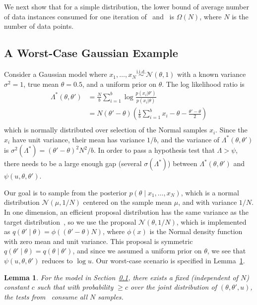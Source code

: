 \documentclass[twoside]{article} \usepackage{aistats2017}
\newcommand{\simiid}{\overset{\textrm{i.i.d.}}{\sim}}
\newtheorem{lemma}{Lemma}
\begin{document}
We next show that for a simple distribution, the lower bound of average
number of data instances consumed for one iteration of~\citet{cutting_mh_2014}
and~\citet{icml2014c1_bardenet14} is $\Omega(N)$, where $N$ is the number of data
points.

\subsection{A Worst-Case Gaussian Example}\label{ssec:gaussian_example}
Consider a Gaussian model where $x_1,\ldots,x_N \simiid \mathcal{N}(\theta,1)$
with a known variance $\sigma^2=1$, true mean $\theta=0.5$, and a uniform prior
on $\theta$. The log likelihood ratio is
\begin{equation}\label{eq:lemma_ll_ratio}
\begin{split}
\Lambda^*(\theta,\theta') & =  \frac{N}{b}\sum_{i=1}^b \log\frac{p(x_i|\theta')}{p(x_i|\theta)} \\
& = N(\theta'-\theta)\left(\frac{1}{b}\sum_{i=1}^b x_i-\theta-\frac{\theta'-\theta}{2}\right) \\
\end{split}
\end{equation}
which is normally distributed over selection of the Normal samples $x_i$.  Since
the $x_i$ have unit variance, their mean has variance $1/b$, and the variance of
$\Lambda^*(\theta,\theta')$ is $\sigma^2(\Lambda^*) = (\theta'-\theta)^2N^2/b$.
In order to pass a hypothesis test that $\Lambda > \psi$, there needs to be a
large enough gap (several $\sigma(\Lambda^*)$) between
$\Lambda^*(\theta,\theta')$ and $\psi(u,\theta,\theta')$. 

Our goal is to sample from the posterior $p(\theta \mid x_1,\ldots,x_N)$, which
is a normal distribution $\mathcal{N}(\mu, 1/N)$ centered on the sample mean
$\mu$, and with variance $1/N$. In one dimension, an efficient proposal
distribution has the same variance as the target
distribution~\citep{OptimalScaling01}, so we use the proposal
$\mathcal{N}(\theta,1/N)$, which is implemented as
$q(\theta'\mid\theta)=\phi((\theta'-\theta)N)$, where $\phi(x)$ is the Normal
density function with zero mean and unit variance. This proposal is symmetric
$q(\theta'\mid\theta)=q(\theta\mid\theta')$, and since we assumed a uniform
prior on $\theta$, we see that $\psi(u,\theta,\theta')$ reduces to $\log u$. Our
worst-case scenario is specified in Lemma~\ref{lem:worst_case}.

\begin{lemma}\label{lem:worst_case}
    For the model in Section~\ref{ssec:gaussian_example}, there exists a fixed
    (independent of $N$) constant $c$ such that with probability $\geq c$ over
    the joint distribution of $(\theta, \theta', u)$, the tests
    from~\cite{cutting_mh_2014,icml2014c1_bardenet14} consume all $N$ samples. 
\end{lemma}
\end{document}
